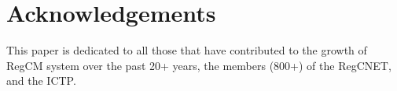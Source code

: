 \section*{Acknowledgements}

This paper is dedicated to all those that have contributed to the growth
of RegCM system over the past 20+ years, the members (800+) of the
RegCNET, and the ICTP.

